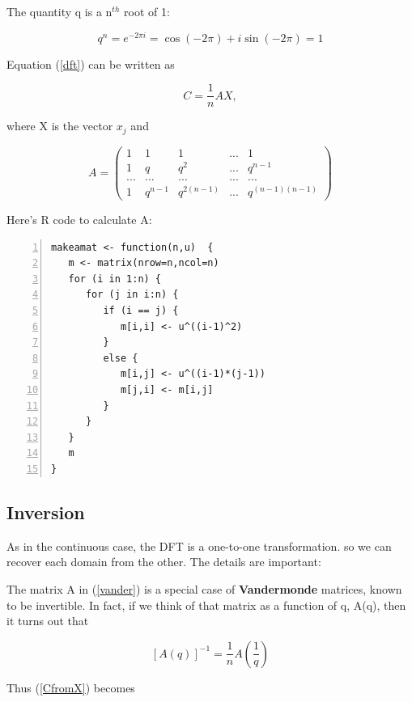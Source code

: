 The quantity q is a n$^{th}$ root of 1:

\begin{equation}
q^n = e^{-2 \pi i} = \cos(-2 \pi) + i \sin(-2 \pi) = 1
\end{equation}

Equation (\ref{dft}) can be written as

\begin{equation}
\label{CfromX}
C = \frac{1}{n} A X,
\end{equation}

where X is the vector $x_j$ and 

\begin{equation}
\label{vander}
A = 
\left (
\begin{array}{ccccc}
1 & 1 & 1 & ... & 1 \\
1 & q & q^2 & ... & q^{n-1} \\
... & ... & ... & ... & ... \\
1 & q^{n-1} & q^{2(n-1)} & ... & q^{(n-1)(n-1)}
\end{array}
\right )
\end{equation}

Here's R code to calculate A:

\begin{Verbatim}[fontsize=\relsize{-2},numbers=left]
makeamat <- function(n,u)  {
   m <- matrix(nrow=n,ncol=n)
   for (i in 1:n) {
      for (j in i:n) {
         if (i == j) {
            m[i,i] <- u^((i-1)^2)
         }
         else {
            m[i,j] <- u^((i-1)*(j-1))
            m[j,i] <- m[i,j]
         }
      }
   }
   m
}
\end{Verbatim}

\subsection{Inversion}

As in the continuous case, the DFT is a one-to-one transformation.  so
we can recover each domain from the other.  The details are important:

The matrix A in (\ref{vander}) is a special case of {\bf Vandermonde}
matrices, known to be invertible.  In fact, if we think of that matrix
as a function of q, A(q), then it turns out that

\begin{equation}
\label{vanderinv}
[A(q)]^{-1} = \frac{1}{n} A(\frac{1}{q})
\end{equation}

Thus (\ref{CfromX}) becomes

